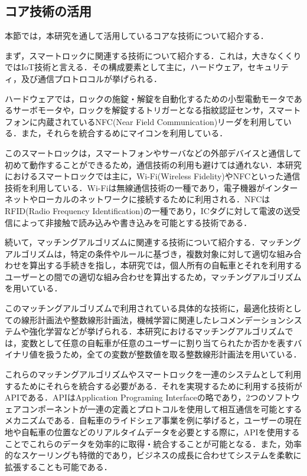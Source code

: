   \subsection{コア技術の活用}
    \label{sec:コア技術の活用}
      \par 本節では，本研究を通して活用しているコアな技術について紹介する．
      \par まず，スマートロックに関連する技術について紹介する．これは，大きなくくりではIoT技術と言える．その構成要素として主に，ハードウェア，セキュリティ，及び通信プロトロコルが挙げられる．
      \par ハードウェアでは，ロックの施錠・解錠を自動化するための小型電動モータであるサーボモータや，ロックを解錠するトリガーとなる指紋認証センサ，スマートフォンに内蔵されているNFC(Near Field Communication)リーダを利用している．また，それらを統合するめにマイコンを利用している．
      \par このスマートロックは，スマートフォンやサーバなどの外部デバイスと通信して初めて動作することができるため，通信技術の利用も避けては通れない．本研究におけるスマートロックでは主に，Wi-Fi(Wireless Fidelity)やNFCといった通信技術を利用している．Wi-Fiは無線通信技術の一種であり，電子機器がインターネットやローカルのネットワークに接続するために利用される．NFCはRFID(Radio Frequency Identification)の一種であり，ICタグに対して電波の送受信によって非接触で読み込みや書き込みを可能とする技術である．
      \par 続いて，マッチングアルゴリズムに関連する技術について紹介する．マッチングアルゴリズムは，特定の条件やルールに基づき，複数対象に対して適切な組み合わせを算出する手続きを指し，本研究では，個人所有の自転車とそれを利用するユーザーとの間での適切な組み合わせを算出するため，マッチングアルゴリズムを用いている．
      \par このマッチングアルゴリズムで利用されている具体的な技術に，最適化技術としての線形計画法や整数線形計画法，機械学習に関連したレコメンデーションシステムや強化学習などが挙げられる．本研究におけるマッチングアルゴリズムでは，変数として任意の自転車が任意のユーザーに割り当てられたか否かを表すバイナリ値を扱うため，全ての変数が整数値を取る整数線形計画法を用いている．
      \par これらのマッチングアルゴリズムやスマートロックを一連のシステムとして利用するためにそれらを統合する必要がある．それを実現するために利用する技術がAPIである．APIはApplication Programing Interfaceの略であり，2つのソフトウェアコンポーネントが一連の定義とプロトコルを使用して相互通信を可能とするメカニズムである\cite{WhatIsAnAPI}．自転車のライドシェア事業を例に挙げると，ユーザーの現在地や自転車の位置などのリアルタイムデータを必要とする際に，APIを使用することでこれらのデータを効率的に取得・統合することが可能となる．また，効率的なスケーリングも特徴的であり，ビジネスの成長に合わせてシステムを柔軟に拡張することも可能である．
